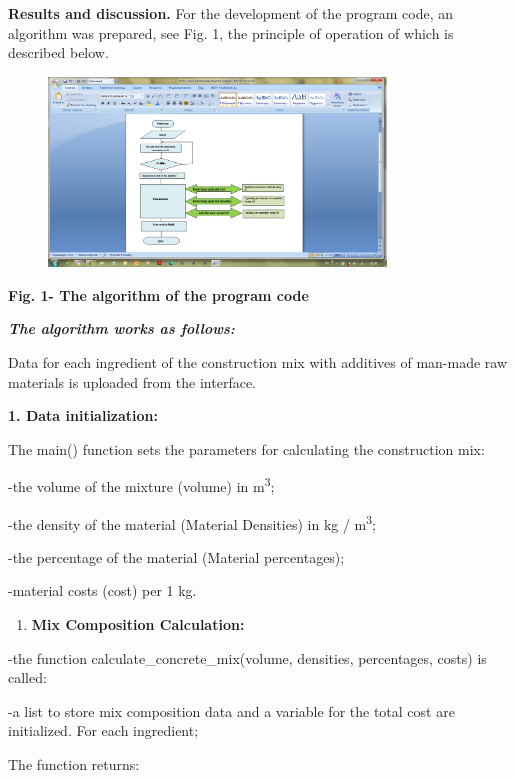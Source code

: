 {{\bfseries Results and discussion.} For the development of the program
code, an algorithm was prepared, see Fig. 1, the principle of operation
of which is described below.

\begin{figure}[H]
	\centering
	\includegraphics[width=0.8\textwidth]{media/ict3/image2}
	\caption*{}
\end{figure}


{\bfseries Fig. 1- The algorithm of the program code}

\emph{{\bfseries The algorithm works as follows:}}

Data for each ingredient of the construction mix with additives of
man-made raw materials is uploaded from the interface.

{\bfseries 1. Data initialization:}

The main() function sets the parameters for calculating the construction
mix:

-the volume of the mixture (volume) in m\textsuperscript{3};

-the density of the material (Material Densities) in kg /
m\textsuperscript{3};

-the percentage of the material (Material percentages);

-material costs (cost) per 1 kg.

\begin{enumerate}
\def\labelenumi{\arabic{enumi}.}
\setcounter{enumi}{1}
\item
  {\bfseries Mix Composition Calculation:}
\end{enumerate}

-the function calculate\_concrete\_mix(volume, densities, percentages,
costs) is called:

-a list to store mix composition data and a variable for the total cost
are initialized. For each ingredient;

The function returns:

}
